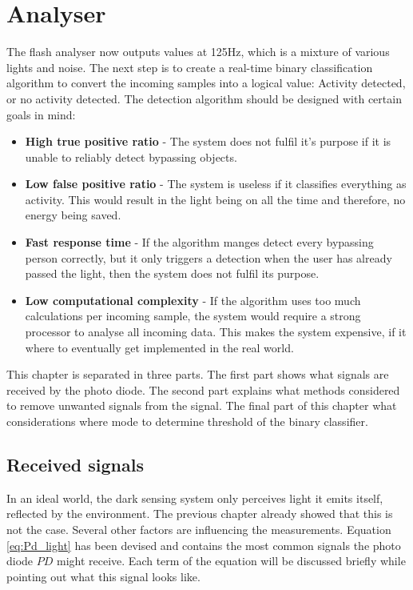 \chapter{Analyser}
\label{chp:Analyser}
The flash analyser now outputs values at 125Hz, which is a mixture of various lights and noise. The next step is to create a real-time binary classification algorithm to convert the incoming samples into a logical value: Activity detected, or no activity detected. The detection algorithm should be designed with certain goals in mind:
\begin{itemize}
	\item \textbf{High true positive ratio} - The system does not fulfil it's purpose if it is unable to reliably detect bypassing objects.
	\item \textbf{Low false positive ratio} - The system is useless if it classifies everything as activity. This would result in the light being on all the time and therefore, no energy being saved.
	\item \textbf{Fast response time} - If the algorithm manges detect every bypassing person correctly, but it only triggers a detection when the user has already passed the light, then the system does not fulfil its purpose.
	\item \textbf{Low computational complexity} - If the algorithm uses too much calculations per incoming sample, the system would require a strong processor to analyse all incoming data. This makes the system expensive, if it where to eventually get implemented in the real world.
\end{itemize}
This chapter is separated in three parts. The first part shows what signals are received by the photo diode. The second part explains what methods considered to remove unwanted signals from the signal. The final part of this chapter what considerations where mode to determine threshold of the binary classifier.

\section{Received signals}
In an ideal world, the dark sensing system only perceives light it emits itself, reflected by the environment. The previous chapter already showed that this is not the case. Several other factors are influencing the measurements. Equation \ref{eq:Pd_light} has been devised and contains the most common signals the photo diode $PD$ might receive. Each term of the equation will be discussed briefly while pointing out what this signal looks like.

